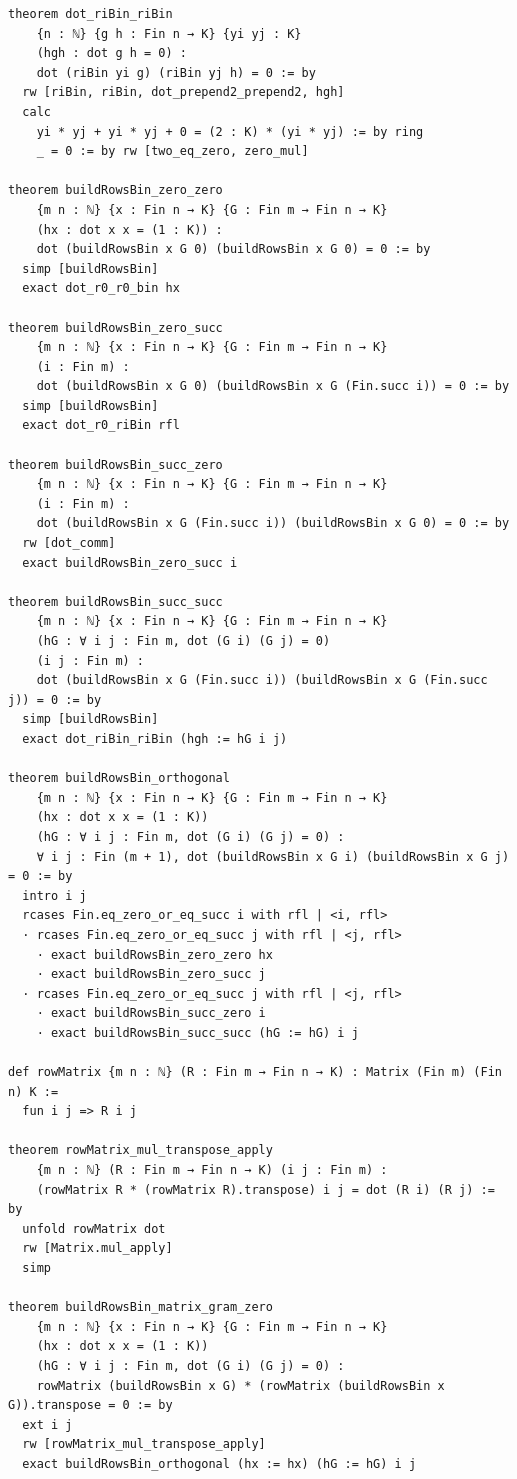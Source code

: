 \documentclass[12pt]{article}
\begin{document}
\begin{lstlisting}[caption={Lean verification for Theorem~\ref{thm:CZ_Kim_Lagrangian}.}]
theorem dot_riBin_riBin
    {n : ℕ} {g h : Fin n → K} {yi yj : K}
    (hgh : dot g h = 0) :
    dot (riBin yi g) (riBin yj h) = 0 := by
  rw [riBin, riBin, dot_prepend2_prepend2, hgh]
  calc
    yi * yj + yi * yj + 0 = (2 : K) * (yi * yj) := by ring
    _ = 0 := by rw [two_eq_zero, zero_mul]

theorem buildRowsBin_zero_zero
    {m n : ℕ} {x : Fin n → K} {G : Fin m → Fin n → K}
    (hx : dot x x = (1 : K)) :
    dot (buildRowsBin x G 0) (buildRowsBin x G 0) = 0 := by
  simp [buildRowsBin]
  exact dot_r0_r0_bin hx

theorem buildRowsBin_zero_succ
    {m n : ℕ} {x : Fin n → K} {G : Fin m → Fin n → K}
    (i : Fin m) :
    dot (buildRowsBin x G 0) (buildRowsBin x G (Fin.succ i)) = 0 := by
  simp [buildRowsBin]
  exact dot_r0_riBin rfl

theorem buildRowsBin_succ_zero
    {m n : ℕ} {x : Fin n → K} {G : Fin m → Fin n → K}
    (i : Fin m) :
    dot (buildRowsBin x G (Fin.succ i)) (buildRowsBin x G 0) = 0 := by
  rw [dot_comm]
  exact buildRowsBin_zero_succ i

theorem buildRowsBin_succ_succ
    {m n : ℕ} {x : Fin n → K} {G : Fin m → Fin n → K}
    (hG : ∀ i j : Fin m, dot (G i) (G j) = 0)
    (i j : Fin m) :
    dot (buildRowsBin x G (Fin.succ i)) (buildRowsBin x G (Fin.succ j)) = 0 := by
  simp [buildRowsBin]
  exact dot_riBin_riBin (hgh := hG i j)

theorem buildRowsBin_orthogonal
    {m n : ℕ} {x : Fin n → K} {G : Fin m → Fin n → K}
    (hx : dot x x = (1 : K))
    (hG : ∀ i j : Fin m, dot (G i) (G j) = 0) :
    ∀ i j : Fin (m + 1), dot (buildRowsBin x G i) (buildRowsBin x G j) = 0 := by
  intro i j
  rcases Fin.eq_zero_or_eq_succ i with rfl | <i, rfl>
  · rcases Fin.eq_zero_or_eq_succ j with rfl | <j, rfl>
    · exact buildRowsBin_zero_zero hx
    · exact buildRowsBin_zero_succ j
  · rcases Fin.eq_zero_or_eq_succ j with rfl | <j, rfl>
    · exact buildRowsBin_succ_zero i
    · exact buildRowsBin_succ_succ (hG := hG) i j

def rowMatrix {m n : ℕ} (R : Fin m → Fin n → K) : Matrix (Fin m) (Fin n) K :=
  fun i j => R i j

theorem rowMatrix_mul_transpose_apply
    {m n : ℕ} (R : Fin m → Fin n → K) (i j : Fin m) :
    (rowMatrix R * (rowMatrix R).transpose) i j = dot (R i) (R j) := by
  unfold rowMatrix dot
  rw [Matrix.mul_apply]
  simp

theorem buildRowsBin_matrix_gram_zero
    {m n : ℕ} {x : Fin n → K} {G : Fin m → Fin n → K}
    (hx : dot x x = (1 : K))
    (hG : ∀ i j : Fin m, dot (G i) (G j) = 0) :
    rowMatrix (buildRowsBin x G) * (rowMatrix (buildRowsBin x G)).transpose = 0 := by
  ext i j
  rw [rowMatrix_mul_transpose_apply]
  exact buildRowsBin_orthogonal (hx := hx) (hG := hG) i j


\end{lstlisting}
\end{document}
